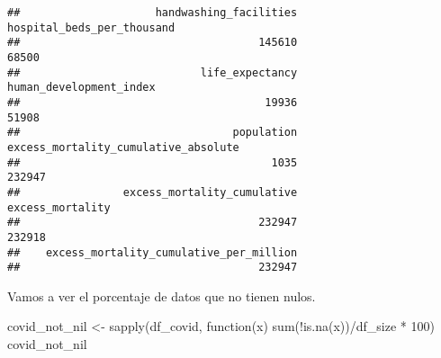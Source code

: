 \documentclass[
]{article}
\newenvironment{Shaded}{\begin{snugshade}}{\end{snugshade}}
\newcommand{\ControlFlowTok}[1]{\textcolor[rgb]{0.94,0.87,0.69}{#1}}
\newcommand{\DecValTok}[1]{\textcolor[rgb]{0.86,0.86,0.80}{#1}}
\newcommand{\KeywordTok}[1]{\textcolor[rgb]{0.94,0.87,0.69}{#1}}
\newcommand{\NormalTok}[1]{\textcolor[rgb]{0.80,0.80,0.80}{#1}}
\newcommand{\OperatorTok}[1]{\textcolor[rgb]{0.94,0.94,0.82}{#1}}
\newcommand{\StringTok}[1]{\textcolor[rgb]{0.80,0.58,0.58}{#1}}
\begin{document}
\begin{verbatim}
##                     handwashing_facilities                 hospital_beds_per_thousand 
##                                     145610                                      68500 
##                            life_expectancy                    human_development_index 
##                                      19936                                      51908 
##                                 population       excess_mortality_cumulative_absolute 
##                                       1035                                     232947 
##                excess_mortality_cumulative                           excess_mortality 
##                                     232947                                     232918 
##    excess_mortality_cumulative_per_million 
##                                     232947
\end{verbatim}

Vamos a ver el porcentaje de datos que no tienen nulos.

\begin{Shaded}
\begin{Highlighting}[]
\NormalTok{covid_not_nil <-}\StringTok{ }\KeywordTok{sapply}\NormalTok{(df_covid, }\ControlFlowTok{function}\NormalTok{(x) }\KeywordTok{sum}\NormalTok{(}\OperatorTok{!}\KeywordTok{is.na}\NormalTok{(x))}\OperatorTok{/}\NormalTok{df_size }\OperatorTok{*}\StringTok{ }\DecValTok{100}\NormalTok{)}
\NormalTok{covid_not_nil}
\end{Highlighting}
\end{Shaded}
\end{document}
